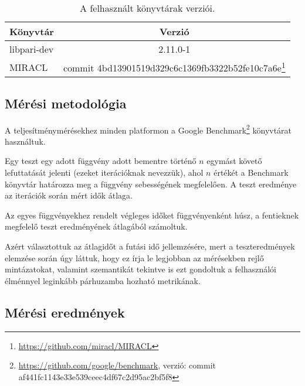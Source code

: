 \begin{table}[H]
\captionsetup{justification=centering}
\centering
  \begin{tabular}{|| l | c ||}
  \hline
  Könyvtár & Verzió \\
  \hline \hline
  libpari-dev                        & 2.11.0-1 \\
  \hline
  MIRACL                  & commit 4bd13901519d329c6c1369fb3322b52fe10c7a6e\footnote{\url{https://github.com/miracl/MIRACL}} \\
  \hline
  \end{tabular}
\caption{A felhasznált könyvtárak verziói.}  
\label{Fuggelek::Table::BenchmarkLibraries}
\end{table}

\subsection*{Mérési metodológia}

A teljesítménymérésekhez minden platformon a Google Benchmark\footnote{\url{https://github.com/google/benchmark}, verzió: commit af441fc1143e33e539ceec4df67c2d95ac2bf5f8} könyvtárat használtuk. 

Egy teszt egy adott függvény adott bementre történő $n$ egymást követő lefuttatását jelenti (ezeket iterációknak nevezzük), ahol $n$ értékét a Benchmark könyvtár határozza meg a függvény sebességének megfelelően. A teszt eredménye az iterációk során mért idők átlaga.

Az egyes függvényekhez rendelt végleges időket függvényenként húsz, a fentieknek megfelelő teszt eredményének átlagából számoltuk.

Azért választottuk az átlagidőt a futási idő jellemzésére, mert a teszteredmények elemzése során úgy láttuk, hogy ez írja le legjobban az mérésekben rejlő mintázatokat, valamint szemantikát tekintve is ezt gondoltuk a felhasználói élménnyel leginkább párhuzamba hozható metrikának.

\subsection*{Mérési eredmények}

